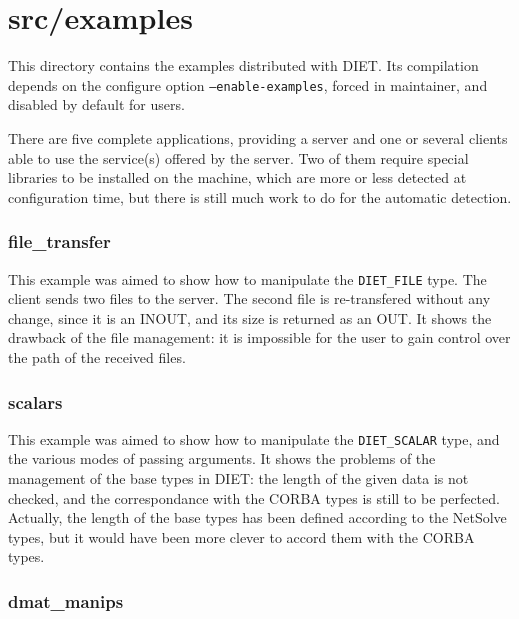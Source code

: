         \section{\textsf{src/examples}}
        \label{s:examples}

        This directory contains the examples distributed with DIET. Its compilation
        depends on the configure option \texttt{--enable-examples}, forced in
        maintainer, and disabled by default for users.

        There are five complete applications, providing a server and one or several
        clients able to use the service(s) offered by the server. Two of them require
        special libraries to be installed on the machine, which are more or less
        detected at configuration time, but there is still much work to do for
        the automatic detection.

        \subsubsection{file\_transfer}

        This example was aimed to show how to manipulate the \texttt{DIET\_FILE} type.
        The client sends two files to the server. The second file is re-transfered
        without any change, since it is an INOUT, and its size is returned as an OUT.
        It shows the drawback of the file management: it is impossible for the user to
        gain control over the path of the received files.

        \subsubsection{scalars}

        This example was aimed to show how to manipulate the \texttt{DIET\_SCALAR} type,
        and the various modes of passing arguments. It shows the problems of the
        management of the base types in DIET: the length of the given data is not
        checked, and the correspondance with the CORBA types is still to be perfected.
        Actually, the length of the base types has been defined according to the
        NetSolve types, but it would have been more clever to accord them with the CORBA
        types.

        \subsubsection{dmat\_manips}

